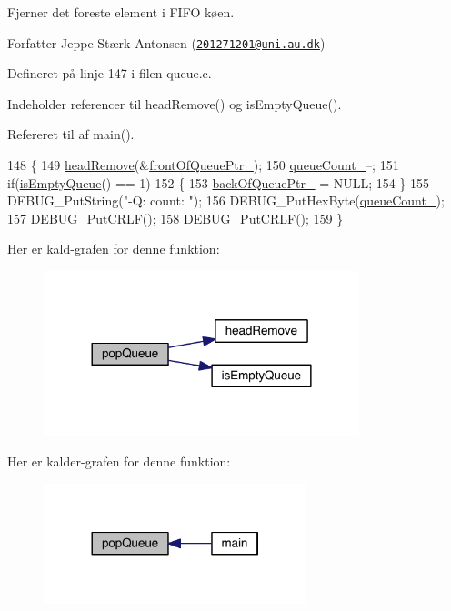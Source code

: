 Fjerner det foreste element i F\+I\+FO køen.

\begin{DoxyAuthor}{Forfatter}
Jeppe Stærk Antonsen (\href{mailto:201271201@uni.au.dk}{\tt 201271201@uni.\+au.\+dk}) 
\end{DoxyAuthor}


Defineret på linje 147 i filen queue.\+c.



Indeholder referencer til head\+Remove() og is\+Empty\+Queue().



Refereret til af main().


\begin{DoxyCode}
148 \{
149   \hyperlink{class_queue_ae54666c891fd21d5497f48c385a00b74}{headRemove}(&\hyperlink{class_queue_aa48f05218d0a78402821c8aa9bdad06a}{frontOfQueuePtr\_});
150   \hyperlink{class_queue_ad260f9ccca00e80d161bbf3e70c3ffa6}{queueCount\_}--;
151   \textcolor{keywordflow}{if}(\hyperlink{class_queue_aafb324c79731abdc228dbf94d86722a3}{isEmptyQueue}() == 1)
152   \{
153     \hyperlink{class_queue_a225d2c9ad4e83d6da443e99b8869a51c}{backOfQueuePtr\_} = NULL;
154   \}
155   DEBUG\_PutString(\textcolor{stringliteral}{"-Q: count: "});
156   DEBUG\_PutHexByte(\hyperlink{class_queue_ad260f9ccca00e80d161bbf3e70c3ffa6}{queueCount\_});
157   DEBUG\_PutCRLF();
158   DEBUG\_PutCRLF();
159 \}
\end{DoxyCode}


Her er kald-\/grafen for denne funktion\+:\nopagebreak
\begin{figure}[H]
\begin{center}
\leavevmode
\includegraphics[width=260pt]{d4/da4/class_queue_a9ecab9ecdedfc331aed9a0ae63ce193b_cgraph}
\end{center}
\end{figure}




Her er kalder-\/grafen for denne funktion\+:\nopagebreak
\begin{figure}[H]
\begin{center}
\leavevmode
\includegraphics[width=216pt]{d4/da4/class_queue_a9ecab9ecdedfc331aed9a0ae63ce193b_icgraph}
\end{center}
\end{figure}


